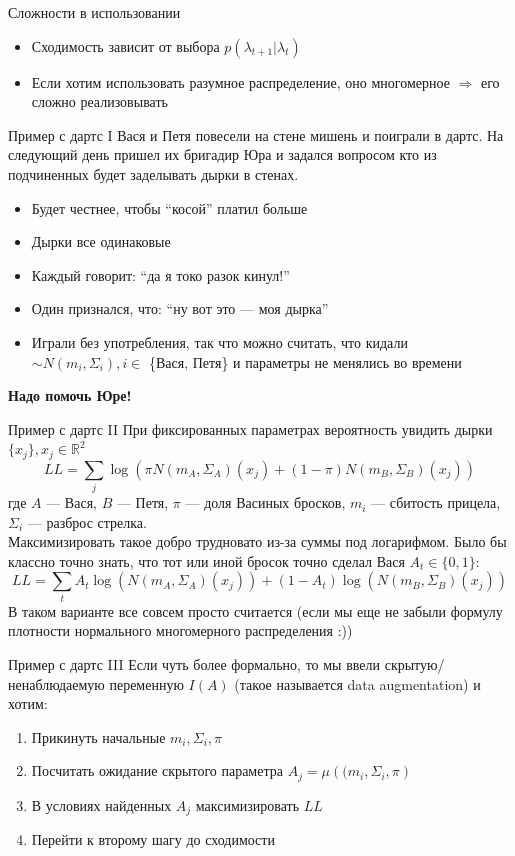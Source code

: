 \documentclass[14pt, fleqn, xcolor={dvipsnames, table}]{beamer}
\begin{document}
\begin{frame}{Сложности в использовании}
\begin{itemize}
  \item Сходимость зависит от выбора $p(\lambda_{t+1}|\lambda_{t})$
  \item Если хотим использовать разумное распределение, оно многомерное $\Rightarrow$ его сложно реализовывать
\end{itemize}
\end{frame}

\begin{frame}{Пример с дартс I}
\small
Вася и Петя повесели на стене мишень и поиграли в дартс. На следующий день пришел их бригадир Юра и задался вопросом кто из подчиненных будет заделывать дырки в стенах.
\begin{itemize}
  \item Будет честнее, чтобы ``косой'' платил больше
  \item Дырки все одинаковые
  \item Каждый говорит: ``да я токо разок кинул!''
  \item Один признался, что: ``ну вот это --- моя дырка''
  \item Играли без употребления, так что можно считать, что кидали $\sim N(m_i, \Sigma_i), i \in$ \{Вася, Петя\} и параметры не менялись во времени
\end{itemize}
\textbf{Надо помочь Юре!}
\end{frame}

\begin{frame}{Пример с дартс II}
\small
При фиксированных параметрах вероятность увидить дырки $\{x_j\}, x_j \in \mathbb{R}^2$
$$
LL = \sum_j \log(\pi N(m_A, \Sigma_A)(x_j) + (1 - \pi) N(m_B, \Sigma_B)(x_j))
$$
где $A$ --- Вася, $B$ --- Петя, $\pi$ --- доля Васиных бросков, $m_i$ --- сбитость прицела, $\Sigma_i$ --- разброс стрелка. \\
Максимизировать такое добро трудновато из-за суммы под логарифмом. Было бы классно точно знать, что тот или иной бросок точно сделал Вася $A_t \in \{0,1\}$:
$$
LL = \sum_t A_t \log(N(m_A, \Sigma_A)(x_j)) +  (1 - A_t) \log(N(m_B, \Sigma_B)(x_j))
$$
В таком варианте все совсем просто считается (если мы еще не забыли формулу плотности нормального многомерного распределения :))
\end{frame}

\begin{frame}{Пример с дартс III}
\small
Если чуть более формально, то мы ввели скрытую/ненаблюдаемую переменную $I(A)$ (такое называется data augmentation) и хотим:
\begin{enumerate}
  \item Прикинуть начальные $m_i, \Sigma_i, \pi$
  \item Посчитать ожидание скрытого параметра $A_j = \mu({(m_i, \Sigma_i}, \pi)$
  \item В условиях найденных $A_j$ максимизировать $LL$
  \item Перейти к второму шагу до сходимости
\end{enumerate}
\end{frame}
\end{document}

